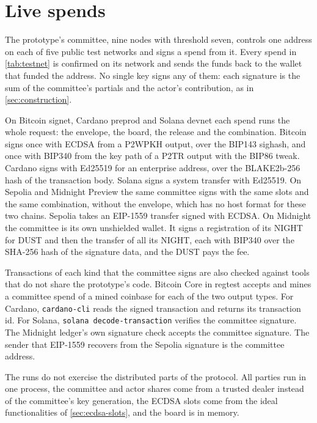 \section{Live spends}\label{sec:testnet}

The prototype's committee, nine nodes with threshold seven, controls one address on each of five public test networks and signs a spend from it. Every spend in \cref{tab:testnet} is confirmed on its network and sends the funds back to the wallet that funded the address. No single key signs any of them: each signature is the sum of the committee's partials and the actor's contribution, as in \cref{sec:construction}.

On Bitcoin signet, Cardano preprod and Solana devnet each spend runs the whole request: the envelope, the board, the release and the combination. Bitcoin signs once with ECDSA from a P2WPKH output, over the BIP143 sighash, and once with BIP340 from the key path of a P2TR output with the BIP86 tweak. Cardano signs with Ed25519 for an enterprise address, over the BLAKE2b-256 hash of the transaction body. Solana signs a system transfer with Ed25519. On Sepolia and Midnight Preview the same committee signs with the same slots and the same combination, without the envelope, which has no host format for these two chains. Sepolia takes an EIP-1559 transfer signed with ECDSA. On Midnight the committee is its own unshielded wallet. It signs a registration of its NIGHT for DUST and then the transfer of all its NIGHT, each with BIP340 over the SHA-256 hash of the signature data, and the DUST pays the fee.

Transactions of each kind that the committee signs are also checked against tools that do not share the prototype's code. Bitcoin Core in regtest accepts and mines a committee spend of a mined coinbase for each of the two output types. For Cardano, \texttt{cardano-cli} reads the signed transaction and returns its transaction id. For Solana, \texttt{solana decode-transaction} verifies the committee signature. The Midnight ledger's own signature check accepts the committee signature. The sender that EIP-1559 recovers from the Sepolia signature is the committee address.

The runs do not exercise the distributed parts of the protocol. All parties run in one process, the committee and actor shares come from a trusted dealer instead of the committee's key generation, the ECDSA slots come from the ideal functionalities of \cref{sec:ecdsa-slots}, and the board is in memory.

